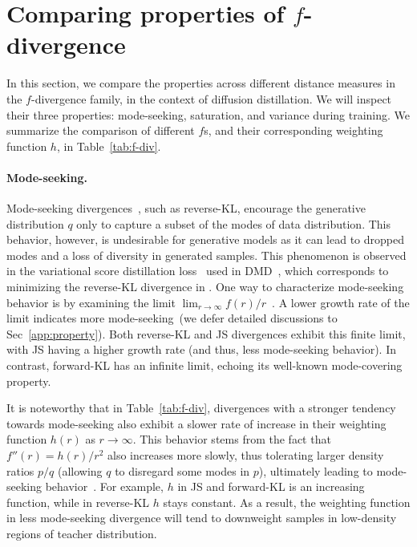 \section{Comparing properties of $f$-divergence}

\label{sec:properties}

In this section, we compare the properties across different distance measures in the $f$-divergence family, in the context of diffusion distillation. We will inspect their three properties: mode-seeking, saturation, and variance during training. We summarize the comparison of different $f$s, and their corresponding weighting function $h$, in Table~\ref{tab:f-div}.

\vspace{-10pt}
\paragraph{Mode-seeking.} Mode-seeking divergences~\cite{Bishop2006PatternRA, pmlr-v206-ting-li23a}, such as reverse-KL, encourage the generative distribution $q$ only to capture a subset of the modes of data distribution. This behavior, however, is undesirable for generative models as it can lead to dropped modes and a loss of diversity in generated samples. This phenomenon is observed in the variational score distillation loss~\cite{lu2024simplifying} used in DMD~\cite{yin2024one, yin2024improved}, which corresponds to minimizing the reverse-KL divergence in \methodtext. One way to characterize mode-seeking behavior is by examining the limit $\lim_{r\to \infty}f(r)/r$~\cite{pmlr-v206-ting-li23a}. A lower growth rate of the limit indicates more mode-seeking~(we defer detailed discussions to Sec~\ref{app:property}). Both reverse-KL and JS divergences exhibit this finite limit, with JS having a higher growth rate (and thus, less mode-seeking behavior). In contrast, forward-KL has an infinite limit, echoing its well-known mode-covering property. 

It is noteworthy that in Table~\ref{tab:f-div}, divergences with a stronger tendency towards mode-seeking also exhibit a slower rate of increase in their weighting function $h(r)$ as $r{\to} \infty$. This behavior stems from the fact that $f''(r)=h(r)/r^2$ also increases more slowly, thus tolerating larger density ratios $p/q$ (\ie allowing $q$ to disregard some modes in $p$), ultimately leading to mode-seeking behavior~\cite{Shannon2020NonsaturatingGT}.
For example, $h$ in JS and forward-KL is an increasing function, while in reverse-KL $h$ stays constant. As a result, the weighting function in less mode-seeking divergence will tend to downweight samples in low-density regions of teacher distribution.  

